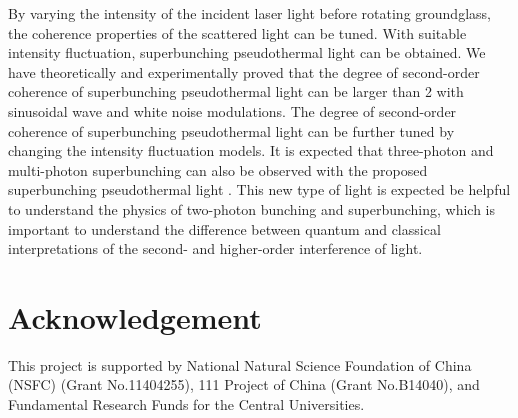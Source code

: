\documentclass[12pt]{iopart}
\begin{document}
By varying the intensity of the incident laser light before rotating groundglass, the coherence properties of the scattered light can be tuned.  With suitable intensity fluctuation, superbunching pseudothermal light can be obtained. We have theoretically and experimentally proved that the degree of second-order coherence of superbunching pseudothermal light can be larger than 2 with sinusoidal wave and white noise modulations. The degree of second-order coherence of superbunching pseudothermal light can be further tuned by changing the intensity fluctuation models.  It is expected that three-photon and multi-photon superbunching can also be observed with the proposed superbunching pseudothermal light \cite{liu-5}. This new type of light is expected be helpful to understand the physics of two-photon bunching and superbunching, which is important to understand the difference between quantum and classical interpretations of the second- and higher-order interference of light.

\section*{Acknowledgement}
This project is supported by National Natural Science Foundation of China (NSFC) (Grant No.11404255), 111 Project of China (Grant No.B14040), and Fundamental Research Funds for the Central Universities.
\end{document}
